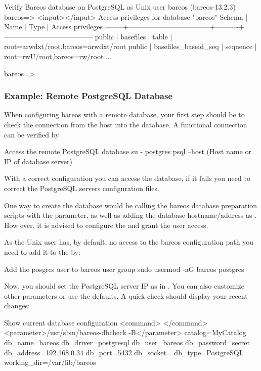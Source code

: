\begin{commands}{Verify Bareos database on PostgreSQL as Unix user bareos (bareos-13.2.3)}
bareos=> <input>\dp</input>
                 Access privileges for database "bareos"
 Schema |               Name                |   Type   |  Access privileges
--------+-----------------------------------+----------+--------------------------------------
 public | basefiles                         | table    | {root=arwdxt/root,bareos=arwdxt/root}
 public | basefiles_baseid_seq              | sequence | {root=rwU/root,bareos=rw/root}
...

bareos=>
\end{commands}

\subsubsection{Example: Remote PostgreSQL Database}
\label{catalog-maintenance-remote-psql}

When configuring bareos with a remote database, your first step should be to check the connection from the \bareosDir host into the database.
A functional connection can be verified by 
\begin{commands}{Access the remote PostgreSQL database}
su - postgres
psql --host (Host name or IP of database server)
\end{commands}
With a correct configuration you can access the database, if it fails you need to correct the PostgreSQL servers configuration files.

One way to create the database would be calling the bareos database preparation scripts with the  parameter,
as well as adding the database hostname/address as . 
How ever, it is advised to configure the \bareosDir {} and grant the  user access.

As the Unix user  has, by default, no access to the bareos configuration path you need to add it to the  by:
\begin{commands}{Add the posgres user to bareos user group}
sudo usermod -aG bareos postgres
\end{commands}

Now, you should set the PostgreSQL server IP as  in .
You can also customize other parameters or use the defaults. A quick check should display your recent changes:
\begin{commands}{Show current database configuration}
<command> </command><parameter>/usr/sbin/bareos-dbcheck -B</parameter>
catalog=MyCatalog
db_name=bareos
db_driver=postgresql
db_user=bareos
db_password=secret
db_address=192.168.0.34
db_port=5432
db_socket=
db_type=PostgreSQL
working_dir=/var/lib/bareos
\end{commands}

